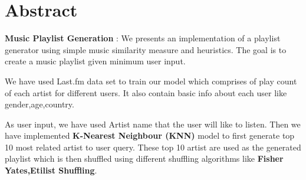 \newpage
\chapter*{\centering Abstract}
{
\textbf{Music Playlist Generation} : 
We presents an implementation of a playlist
generator using simple music similarity measure and heuristics. The goal is to create a music playlist given minimum user input. 

We have used Last.fm data set to train our model which comprises of play count of each artist for different users. It also contain basic info about each user like gender,age,country.

As user input, we have used Artist name that the user will like to listen. Then we  have implemented \textbf{ K-Nearest Neighbour (KNN)} model to first generate top 10 most related artist to user query. These top 10 artist are used as the generated playlist which is then shuffled using different shuffling algorithms like \textbf{Fisher Yates,Etilist Shuffling}. 

}

 